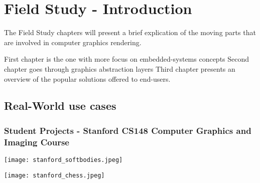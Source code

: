 



\chapter*{Field Study - Introduction}
  The Field Study chapters will present a brief explication of the moving parts that are involved in computer graphics rendering.

  First chapter is the one with more focus on embedded-systems concepts 
  Second chapter goes through graphics abstraction layers 
  Third chapter presents an overview of the popular solutions offered to end-users. 

  \section*{Real-World use cases}
      \subsection*{Student Projects - Stanford CS148 Computer Graphics and Imaging Course}
        \texttt{[image: stanford\_softbodies.jpeg]}

        \texttt{[image: stanford\_chess.jpeg]}



